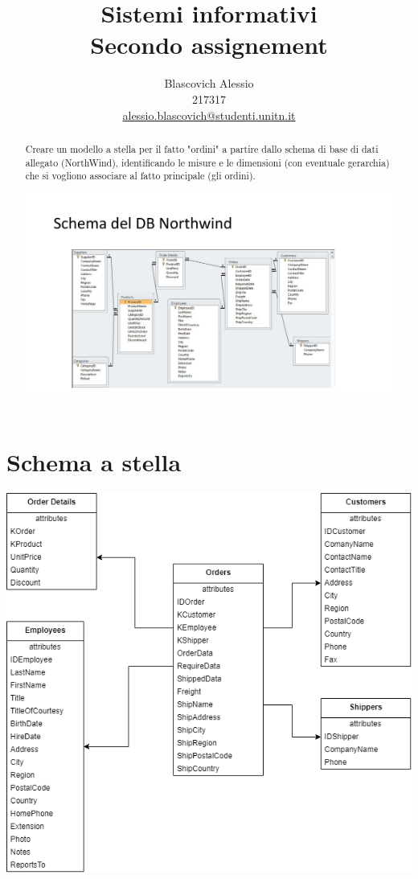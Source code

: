 \documentclass{report}
\author{Blascovich Alessio\\ 217317\\ \href{mailto:alessio.blascovich@studenti.unitn.it}{alessio.blascovich@studenti.unitn.it}}
\title{Sistemi informativi\\ Secondo assignement}
\date{}
\begin{document}
   \maketitle

   \begin{abstract}
      Creare un modello a stella per il fatto "ordini" a partire dallo schema di base di dati allegato (NorthWind), identificando le misure e le dimensioni (con eventuale gerarchia) che si vogliono associare al fatto principale (gli ordini).
      \begin{center}
         \includegraphics[scale=0.5]{testo_assignement.png}
      \end{center}
   \end{abstract}

   \chapter*{Schema a stella}
   \begin{center}
      \includegraphics[scale=0.7]{Assignement2.png}
   \end{center}
\end{document}
